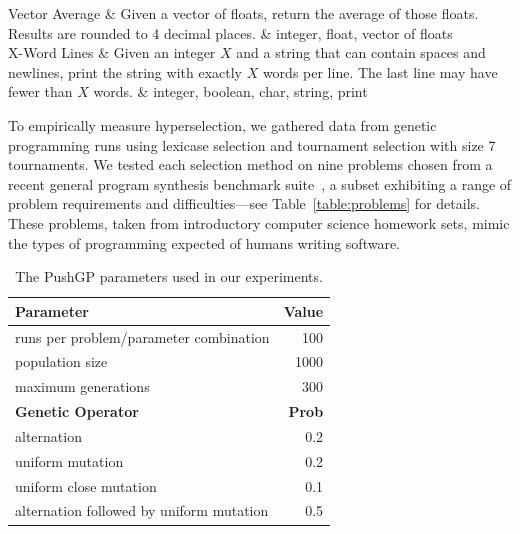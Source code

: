 \documentclass{sig-alternate}
\begin{document}
\begin{table}[t]
\begin{tabu}
		Vector Average             & Given a vector of floats, return the average of those floats. Results are rounded to 4 decimal places. & integer, float, vector of floats \\
		X-Word Lines               & Given an integer $X$  and a string that can contain spaces and newlines, print the string with exactly $X$ words per line. The last line may have fewer than $X$ words. & integer, boolean, char, string, print \\
		\bottomrule
	\end{tabu}
\end{table}


To empirically measure hyperselection, we gathered data from genetic programming runs using lexicase selection and tournament selection with size 7 tournaments. We tested each selection method on nine problems chosen from a recent general program synthesis benchmark suite~\cite{Helmuth:2015:GECCO}, a subset exhibiting a range of problem requirements and difficulties---see Table~\ref{table:problems} for details. These problems, taken from introductory computer science homework sets, mimic the types of programming expected of humans writing software.

\begin{table}[t]
\centering
\caption{The PushGP parameters used in our experiments.}
\label{table:parameters}
\begin{tabular}{l r}
\toprule
\textbf{Parameter} & \textbf{Value} \tabularnewline
\midrule
runs per problem/parameter combination & 100 \tabularnewline
population size & 1000 \tabularnewline
maximum generations & 300 \tabularnewline
\midrule
\textbf{Genetic Operator} & \textbf{Prob} \tabularnewline
\midrule
alternation & 0.2 \tabularnewline
uniform mutation & 0.2 \tabularnewline
uniform close mutation & 0.1 \tabularnewline
alternation followed by uniform mutation & 0.5 \tabularnewline
\bottomrule
\end{tabular}
\end{table}
\end{document}
